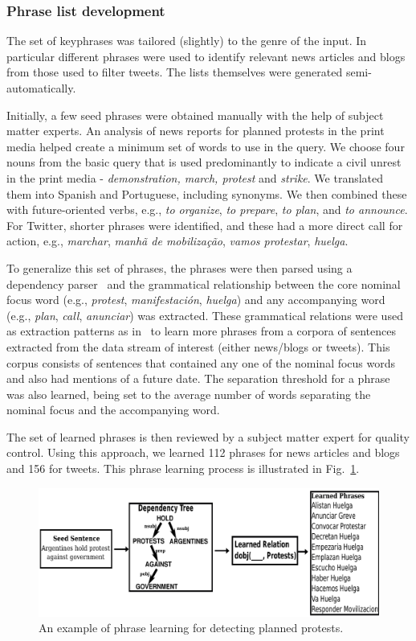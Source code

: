 \documentclass[letterpaper]{article}
\begin{document}
\subsubsection{Phrase list development}
\label{sec:phraselearning}
The set of keyphrases was tailored (slightly) to the genre of the
input. In particular different phrases were used to identify relevant
news articles and blogs from those used to filter tweets.  The lists
themselves were generated semi-automatically.

Initially, a few seed phrases were obtained manually with the help of
subject matter experts.  An analysis of news reports for planned
protests in the print media helped create a minimum set of words to use
in the query.  We choose four nouns from the basic query that is used
predominantly to indicate a civil unrest in the print media - {\em
demonstration, march, protest} and {\it strike}. We translated them into
Spanish and Portuguese, including synonyms.  We then combined these with
future-oriented verbs, e.g., {\em to organize}, {\em to prepare}, {\em
to plan}, and {\em to announce}. For Twitter, shorter phrases were
identified, and these had a more direct call for action, e.g., {\em
marchar}, {\em manhã de mobilização}, {\em vamos protestar}, {\em
huelga}.

To generalize this set of phrases, the phrases were then parsed
using a dependency parser~\cite{freeling} and the grammatical
relationship between the core nominal focus word (e.g., {\em protest}, 
{\em manifestación}, {\em huelga}) and any accompanying
word (e.g., {\em plan}, {\em call}, {\em anunciar}) was
extracted. These grammatical relations were used as extraction
patterns as in~\cite{riloff2003learning} to learn more phrases from a
corpora of sentences extracted from the data stream of interest
(either news/blogs or tweets). This corpus consists of sentences that
contained any one of the nominal focus words and also had mentions of
a future date. The separation threshold for a phrase was also
learned, being set to the average number of words separating
the nominal focus and the accompanying word.

The set of learned phrases is then reviewed by a subject matter expert for quality control.  
Using this approach, we learned 112 phrases for news articles and blogs and 156 for tweets.  
This phrase learning process is illustrated in Fig.~\ref{fig:phraselearning}.

\begin{figure}
  \centering
\includegraphics[width=.9\textwidth]{figures/phraseLearning}
\caption{An example of phrase learning for detecting planned protests.}
\label{fig:phraselearning}
\end{figure}
\end{document}
